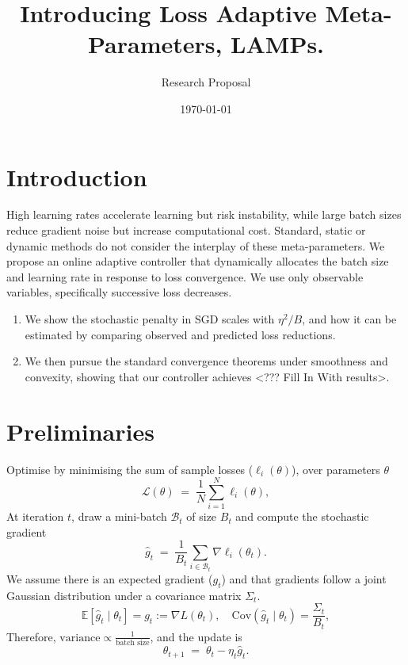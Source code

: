 \documentclass[12pt]{article}
\title{Introducing Loss Adaptive Meta-Parameters, LAMPs.}
\author{Research Proposal}
\date{\today}
\begin{document}
\maketitle

\section{Introduction}
High learning rates accelerate learning but risk instability, while large batch sizes reduce gradient noise but increase computational cost.
Standard, static or dynamic methods do not consider the interplay of these meta-parameters.  
We propose an online adaptive controller that dynamically allocates the batch size and learning rate in response to loss convergence. 
We use only observable variables, specifically successive loss decreases.
\begin{enumerate}
\item We show the stochastic penalty in SGD scales with $\eta^2/B$, and how it can be estimated by comparing observed and predicted loss reductions.
\item We then pursue the standard convergence theorems under smoothness and convexity, showing that our controller achieves <??? Fill In With results>.
\end{enumerate}

\section{Preliminaries}

Optimise by minimising the sum of sample losses ($\ell_i(\theta)$), over parameters $\theta$
\[
\mathcal{L}(\theta) \;=\; \frac{1}{N}\sum_{i=1}^N \ell_i(\theta), 
\]
At iteration $t$, draw a mini-batch $\mathcal{B}_t$ of size $B_t$ and compute the stochastic gradient
\[
\widehat g_t \;=\; \frac{1}{B_t}\sum_{i\in \mathcal{B}_t}\nabla \ell_i(\theta_t).
\]
We assume there is an expected gradient ($g_t$) and that gradients follow a joint Gaussian distribution under a covariance matrix $\Sigma_t$. 
\[
\mathbb{E}[\widehat g_t \mid \theta_t] = g_t := \nabla L(\theta_t), 
\quad
\mathrm{Cov}(\widehat g_t \mid \theta_t) = \frac{\Sigma_t}{B_t},
\]
Therefore,  $\text{variance} \propto \frac{1}{\text{batch size}}$, and the update is
\[
\theta_{t+1} \;=\; \theta_t - \eta_t \widehat g_t.
\]
\end{document}
